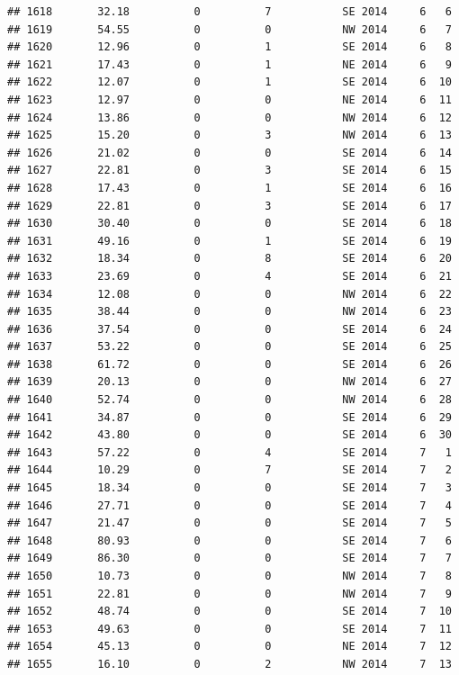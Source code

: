 \documentclass[
]{article}
\begin{document}
\begin{verbatim}
## 1618       32.18          0          7           SE 2014     6   6
## 1619       54.55          0          0           NW 2014     6   7
## 1620       12.96          0          1           SE 2014     6   8
## 1621       17.43          0          1           NE 2014     6   9
## 1622       12.07          0          1           SE 2014     6  10
## 1623       12.97          0          0           NE 2014     6  11
## 1624       13.86          0          0           NW 2014     6  12
## 1625       15.20          0          3           NW 2014     6  13
## 1626       21.02          0          0           SE 2014     6  14
## 1627       22.81          0          3           SE 2014     6  15
## 1628       17.43          0          1           SE 2014     6  16
## 1629       22.81          0          3           SE 2014     6  17
## 1630       30.40          0          0           SE 2014     6  18
## 1631       49.16          0          1           SE 2014     6  19
## 1632       18.34          0          8           SE 2014     6  20
## 1633       23.69          0          4           SE 2014     6  21
## 1634       12.08          0          0           NW 2014     6  22
## 1635       38.44          0          0           NW 2014     6  23
## 1636       37.54          0          0           SE 2014     6  24
## 1637       53.22          0          0           SE 2014     6  25
## 1638       61.72          0          0           SE 2014     6  26
## 1639       20.13          0          0           NW 2014     6  27
## 1640       52.74          0          0           NW 2014     6  28
## 1641       34.87          0          0           SE 2014     6  29
## 1642       43.80          0          0           SE 2014     6  30
## 1643       57.22          0          4           SE 2014     7   1
## 1644       10.29          0          7           SE 2014     7   2
## 1645       18.34          0          0           SE 2014     7   3
## 1646       27.71          0          0           SE 2014     7   4
## 1647       21.47          0          0           SE 2014     7   5
## 1648       80.93          0          0           SE 2014     7   6
## 1649       86.30          0          0           SE 2014     7   7
## 1650       10.73          0          0           NW 2014     7   8
## 1651       22.81          0          0           NW 2014     7   9
## 1652       48.74          0          0           SE 2014     7  10
## 1653       49.63          0          0           SE 2014     7  11
## 1654       45.13          0          0           NE 2014     7  12
## 1655       16.10          0          2           NW 2014     7  13

\end{verbatim}
\end{document}
